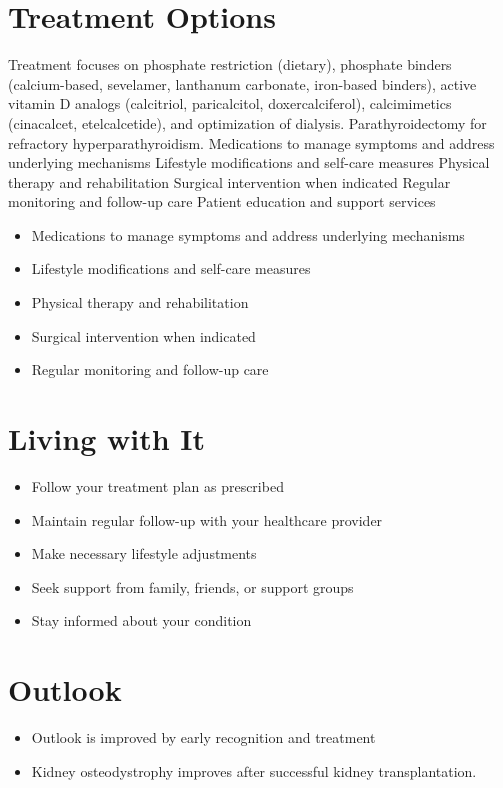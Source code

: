 \section{Treatment Options}
Treatment focuses on phosphate restriction (dietary), phosphate binders (calcium-based, sevelamer, lanthanum carbonate, iron-based binders), active vitamin D analogs (calcitriol, paricalcitol, doxercalciferol), calcimimetics (cinacalcet, etelcalcetide), and optimization of dialysis. Parathyroidectomy for refractory hyperparathyroidism. Medications to manage symptoms and address underlying mechanisms Lifestyle modifications and self-care measures Physical therapy and rehabilitation Surgical intervention when indicated Regular monitoring and follow-up care Patient education and support services

\begin{itemize}[noitemsep]
  \item Medications to manage symptoms and address underlying mechanisms
  \item Lifestyle modifications and self-care measures
  \item Physical therapy and rehabilitation
  \item Surgical intervention when indicated
  \item Regular monitoring and follow-up care
\end{itemize}
\section{Living with It}
\begin{itemize}[noitemsep]
  \item Follow your treatment plan as prescribed
  \item Maintain regular follow-up with your healthcare provider
  \item Make necessary lifestyle adjustments
  \item Seek support from family, friends, or support groups
  \item Stay informed about your condition
\end{itemize}
\section{Outlook}
\begin{itemize}[noitemsep]
  \item Outlook is improved by early recognition and treatment
  \item Kidney osteodystrophy improves after successful kidney transplantation.
\end{itemize}
